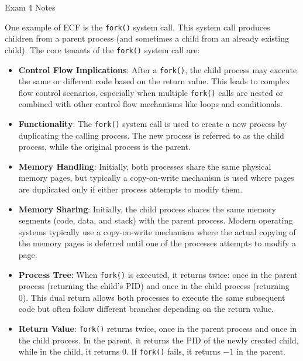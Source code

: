 \begin{examnotes}{Exam 4 Notes}
    \begin{highlight}
        One example of ECF is the \texttt{fork()} system call. This system call produces children from a parent process (and sometimes a child from an already existing child). The core tenants of the 
        \texttt{fork()} system call are:
    
        \begin{itemize}
            \item \textbf{Control Flow Implications}: After a \texttt{fork()}, the child process may execute the same or different code based on the return value. This leads to complex flow control 
            scenarios, especially when multiple \texttt{fork()} calls are nested or combined with other control flow mechanisms like loops and conditionals.
            \item \textbf{Functionality}: The \texttt{fork()} system call is used to create a new process by duplicating the calling process. The new process is referred to as the child process, while 
            the original process is the parent.
            \item \textbf{Memory Handling}: Initially, both processes share the same physical memory pages, but typically a copy-on-write mechanism is used where pages are duplicated only if either process 
            attempts to modify them.
            \item \textbf{Memory Sharing}: Initially, the child process shares the same memory segments (code, data, and stack) with the parent process. Modern operating systems typically use a 
            copy-on-write mechanism where the actual copying of the memory pages is deferred until one of the processes attempts to modify a page.
            \item \textbf{Process Tree}: When \texttt{fork()} is executed, it returns twice: once in the parent process (returning the child's PID) and once in the child process (returning 0). This dual 
            return allows both processes to execute the same subsequent code but often follow different branches depending on the return value.
            \item \textbf{Return Value}: \texttt{fork()} returns twice, once in the parent process and once in the child process. In the parent, it returns the PID of the newly created child, while 
            in the child, it returns 0. If \texttt{fork()} fails, it returns $-1$ in the parent.
        \end{itemize}
    \end{highlight}


\end{examnotes}

